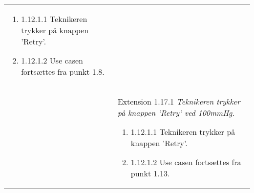 \begin{table}[H]
\begin{tabular}{|p{5.5cm}|p{10cm}|}
\begin{enumerate}
\setlength\itemsep{0.1em}
\item[\labelname]1.12.1.1   Teknikeren trykker på knappen 'Retry'.
\item[\labelname]1.12.1.2   Use casen fortsættes fra punkt 1.8. 
\end{enumerate}
\\
& Extension 1.17.1 \textit{Teknikeren trykker på knappen 'Retry' ved 100mmHg.}
\begin{enumerate}
\setlength\itemsep{0.1em}
\item[\labelname]1.12.1.1   Teknikeren trykker på knappen 'Retry'.
\item[\labelname]1.12.1.2   Use casen fortsættes fra punkt 1.13. 
\end{enumerate}
\\\hline
\end{tabular}
\end{table}

